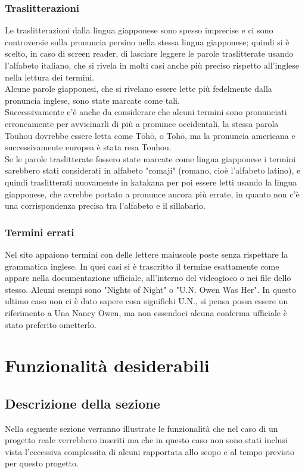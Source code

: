 \documentclass[openany, a4paper, 12pt]{report}
\begin{document}
			\subsection{Traslitterazioni}
				Le traslitterazioni dalla lingua giapponese sono spesso imprecise e ci sono controversie sulla pronuncia persino nella stessa lingua giapponese; quindi si è scelto, in caso di screen reader, di lasciare leggere le parole traslitterate usando l'alfabeto italiano, che si rivela in molti casi anche più preciso rispetto all'inglese nella lettura dei termini.\\
				Alcune parole giapponesi, che si rivelano essere lette più fedelmente dalla pronuncia inglese, sono state marcate come tali.\\
				Successivamente c'è anche da considerare che alcuni termini sono pronunciati erroneamente per avvicinarli di più a pronunce occidentali, la stessa parola Touhou dovrebbe essere letta come Tōhō, o Tohō, ma la pronuncia americana e successivamente europea è stata resa Touhou.\\
				Se le parole traslitterate fossero state marcate come lingua giapponese i termini sarebbero stati considerati in alfabeto "romaji" (romano, cioè l'alfabeto latino), e quindi traslitterati nuovamente in katakana per poi essere letti usando la lingua giapponese, che avrebbe portato a pronunce ancora più errate, in quanto non c'è una corrispondenza precisa tra l'alfabeto e il sillabario.
				
			\subsection{Termini errati}
				Nel sito appaiono termini con delle lettere maiuscole poste senza rispettare la grammatica inglese. In quei casi si è trascritto il termine esattamente come appare nella documentazione ufficiale, all'interno del videogioco o nei file dello stesso. Alcuni esempi sono "Nights of Night" o "U.N. Owen Was Her". In questo ultimo caso non ci è dato sapere cosa significhi U.N., si pensa possa essere un riferimento a Una Nancy Owen, ma non essendoci alcuna conferma ufficiale è stato preferito ometterlo.\\

	\chapter{Funzionalit\`{a} desiderabili}
		\section{Descrizione della sezione}
		Nella seguente sezione verranno illustrate le funzionalità che nel caso di un progetto reale verrebbero inseriti ma che in questo caso non sono stati inclusi vista l'eccessiva complessita di alcuni rapportata allo scopo e al tempo previsto per questo progetto.
\end{document}
